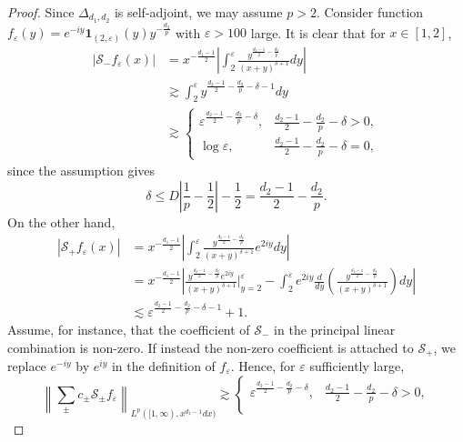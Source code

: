 \documentclass[12pt]{amsart}
\newcommand\Lapd{\Delta_{d_1, d_2}}
\begin{document}
\begin{proof}
Since $\Lapd$ is self-adjoint, we may assume $p>2$. Consider function $f_\varepsilon(y) = e^{-iy} \mathbf{1}_{(2,\varepsilon)}(y) y^{-\frac{d_2}{p}}$ with $\varepsilon > 100$ large. It is clear that for $x\in [1,2]$,
\begin{align*}
    |\mathcal{S}_{-}f_\varepsilon(x)| &= x^{-\frac{d_1-1}{2}} \left|\int_2^{\varepsilon} \frac{y^{\frac{d_2-1}{2}-\frac{d_2}{p}}}{(x+y)^{\delta+1}}  dy\right|\\
    &\gtrsim  \int_2^{\varepsilon} y^{\frac{d_2-1}{2}-\frac{d_2}{p}-\delta-1}  dy\\
    &\gtrsim \begin{cases}
        \varepsilon^{\frac{d_2-1}{2}-\frac{d_2}{p}-\delta}, & \frac{d_2-1}{2}-\frac{d_2}{p}-\delta >0,\\
        \log{\varepsilon}, & \frac{d_2-1}{2}-\frac{d_2}{p}-\delta = 0,
    \end{cases}
\end{align*}
since the assumption gives
\begin{equation*}
    \delta \le D \left|\frac{1}{p}-\frac{1}{2}\right|-\frac{1}{2} = \frac{d_2-1}{2}-\frac{d_2}{p}.
\end{equation*}
On the other hand,
\begin{align*}
    |\mathcal{S}_+ f_\varepsilon(x)|
    &=
    x^{-\frac{d_1-1}{2}}
    \left|
    \int_2^\varepsilon
    \frac{y^{\frac{d_2-1}{2}-\frac{d_2}{p}}}{(x+y)^{\delta+1}}e^{2iy}dy
    \right|\\
    &=
    x^{-\frac{d_1-1}{2}}
    \left|
    \frac{y^{\frac{d_2-1}{2}-\frac{d_2}{p}}e^{2iy}}{(x+y)^{\delta+1}}\bigg|_{y=2}^{\varepsilon}
    -
    \int_2^\varepsilon
    e^{2iy}\frac{d}{dy}
    \left(
    \frac{y^{\frac{d_2-1}{2}-\frac{d_2}{p}}}{(x+y)^{\delta+1}}
    \right)dy
    \right|\\
    &\lesssim
    \varepsilon^{\frac{d_2-1}{2}-\frac{d_2}{p}-\delta-1}+1.
\end{align*}
Assume, for instance, that the coefficient of $\mathcal S_-$ in the principal linear combination is non-zero. If instead the non-zero coefficient is attached to $\mathcal S_+$, we replace $e^{-iy}$ by $e^{iy}$ in the definition of $f_\varepsilon$. Hence, for $\varepsilon$ sufficiently large,
\begin{equation*}
    \left\|\sum_{\pm}c_\pm \mathcal S_\pm f_\varepsilon\right\|_{L^p([1,\infty),x^{d_1-1}dx)}
    \gtrsim
    \begin{cases}
        \varepsilon^{\frac{d_2-1}{2}-\frac{d_2}{p}-\delta}, & \frac{d_2-1}{2}-\frac{d_2}{p}-\delta > 0,\\

\end{cases}
\end{equation*}
\end{proof}
\end{document}
